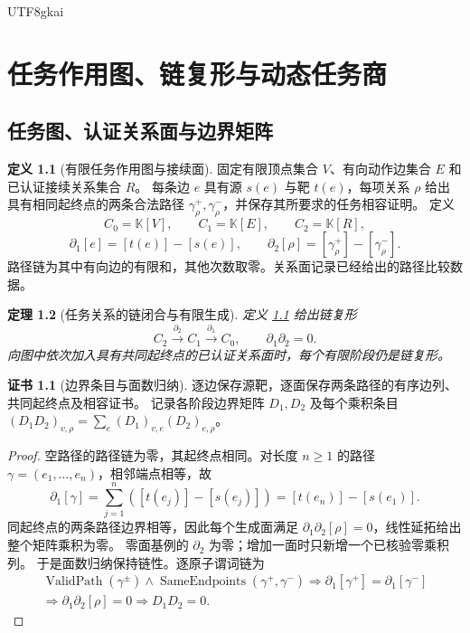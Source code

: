 \documentclass[12pt,a4paper,openany,notitlepage]{report}
\theoremstyle{plain}
\newtheorem{theorem}{定理}[chapter]
\theoremstyle{definition}
\newtheorem{definition}[theorem]{定义}
\newtheorem*{certificate}{证书}
\theoremstyle{remark}
\begin{document}
\begin{CJK*}{UTF8}{gkai}
\chapter{任务作用图、链复形与动态任务商}
\label{exp:ch:task}

\label{hgov:sec:taskcomplex}

\section{任务图、认证关系面与边界矩阵}

\begin{definition}[有限任务作用图与接续面]
\label{hgov:def:taskcomplex}
固定有限顶点集合 $V$、有向动作边集合 $E$ 和已认证接续关系集合 $R$。
每条边 $e$ 具有源 $s(e)$ 与靶 $t(e)$，每项关系 $\rho$ 给出具有相同起终点的两条合法路径
$\gamma_\rho^+,\gamma_\rho^-$，并保存其所要求的任务相容证明。
定义
\[
C_0=\mathbb K[V],\qquad C_1=\mathbb K[E],\qquad C_2=\mathbb K[R],
\]
\[
\partial_1[e]=[t(e)]-[s(e)],\qquad
\partial_2[\rho]=[\gamma_\rho^+]-[\gamma_\rho^-].
\]
路径链为其中有向边的有限和，其他次数取零。关系面记录已经给出的路径比较数据。
\end{definition}

\begin{theorem}[任务关系的链闭合与有限生成]
\label{hgov:thm:complex}
定义 \ref{hgov:def:taskcomplex} 给出链复形
\[
C_2\xrightarrow{\partial_2}C_1\xrightarrow{\partial_1}C_0,
\qquad \partial_1\partial_2=0.
\]
向图中依次加入具有共同起终点的已认证关系面时，每个有限阶段仍是链复形。
\end{theorem}
\begin{certificate}[边界条目与面数归纳]
逐边保存源靶，逐面保存两条路径的有序边列、共同起终点及相容证书。
记录各阶段边界矩阵 $D_1,D_2$ 及每个乘积条目
$ (D_1D_2)_{v,\rho}=\sum_e(D_1)_{v,e}(D_2)_{e,\rho}$。
\end{certificate}
\begin{proof}
空路径的路径链为零，其起终点相同。对长度 $n\ge1$ 的路径
$\gamma=(e_1,\ldots,e_n)$，相邻端点相等，故
\[
\partial_1[\gamma]
=\sum_{j=1}^n([t(e_j)]-[s(e_j)])
=[t(e_n)]-[s(e_1)].
\]
同起终点的两条路径边界相等，因此每个生成面满足
$\partial_1\partial_2[\rho]=0$，线性延拓给出整个矩阵乘积为零。
零面基例的 $\partial_2$ 为零；增加一面时只新增一个已核验零乘积列。
于是面数归纳保持链性。逐原子谓词链为
\[
\begin{gathered}
\operatorname{ValidPath}(\gamma^\pm)\land
\operatorname{SameEndpoints}(\gamma^+,\gamma^-)
\Rightarrow
\partial_1[\gamma^+]=\partial_1[\gamma^-]\\
\Rightarrow\partial_1\partial_2[\rho]=0
\Rightarrow D_1D_2=0.
\end{gathered}
\]
\end{proof}


\end{CJK*}
\end{document}
